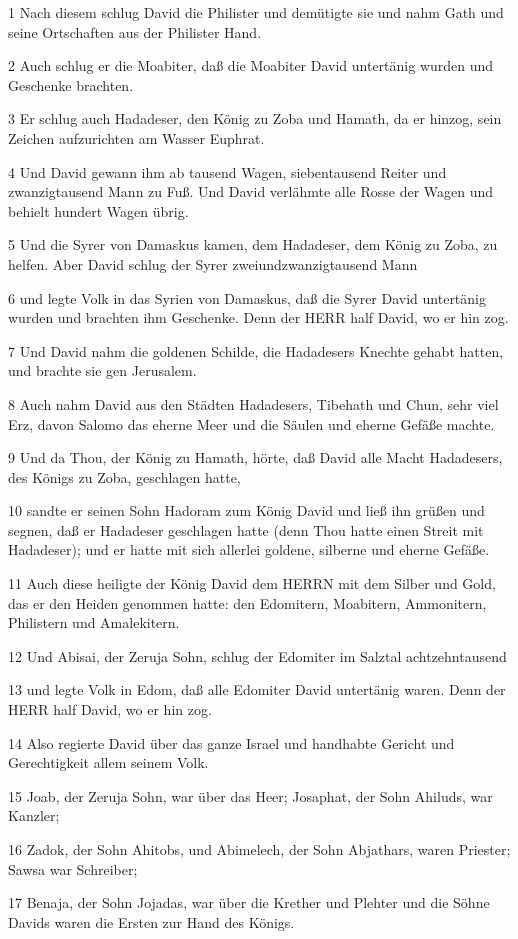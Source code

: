 \par 1 Nach diesem schlug David die Philister und demütigte sie und nahm Gath und seine Ortschaften aus der Philister Hand.
\par 2 Auch schlug er die Moabiter, daß die Moabiter David untertänig wurden und Geschenke brachten.
\par 3 Er schlug auch Hadadeser, den König zu Zoba und Hamath, da er hinzog, sein Zeichen aufzurichten am Wasser Euphrat.
\par 4 Und David gewann ihm ab tausend Wagen, siebentausend Reiter und zwanzigtausend Mann zu Fuß. Und David verlähmte alle Rosse der Wagen und behielt hundert Wagen übrig.
\par 5 Und die Syrer von Damaskus kamen, dem Hadadeser, dem König zu Zoba, zu helfen. Aber David schlug der Syrer zweiundzwanzigtausend Mann
\par 6 und legte Volk in das Syrien von Damaskus, daß die Syrer David untertänig wurden und brachten ihm Geschenke. Denn der HERR half David, wo er hin zog.
\par 7 Und David nahm die goldenen Schilde, die Hadadesers Knechte gehabt hatten, und brachte sie gen Jerusalem.
\par 8 Auch nahm David aus den Städten Hadadesers, Tibehath und Chun, sehr viel Erz, davon Salomo das eherne Meer und die Säulen und eherne Gefäße machte.
\par 9 Und da Thou, der König zu Hamath, hörte, daß David alle Macht Hadadesers, des Königs zu Zoba, geschlagen hatte,
\par 10 sandte er seinen Sohn Hadoram zum König David und ließ ihn grüßen und segnen, daß er Hadadeser geschlagen hatte (denn Thou hatte einen Streit mit Hadadeser); und er hatte mit sich allerlei goldene, silberne und eherne Gefäße.
\par 11 Auch diese heiligte der König David dem HERRN mit dem Silber und Gold, das er den Heiden genommen hatte: den Edomitern, Moabitern, Ammonitern, Philistern und Amalekitern.
\par 12 Und Abisai, der Zeruja Sohn, schlug der Edomiter im Salztal achtzehntausend
\par 13 und legte Volk in Edom, daß alle Edomiter David untertänig waren. Denn der HERR half David, wo er hin zog.
\par 14 Also regierte David über das ganze Israel und handhabte Gericht und Gerechtigkeit allem seinem Volk.
\par 15 Joab, der Zeruja Sohn, war über das Heer; Josaphat, der Sohn Ahiluds, war Kanzler;
\par 16 Zadok, der Sohn Ahitobs, und Abimelech, der Sohn Abjathars, waren Priester; Sawsa war Schreiber;
\par 17 Benaja, der Sohn Jojadas, war über die Krether und Plehter und die Söhne Davids waren die Ersten zur Hand des Königs.

